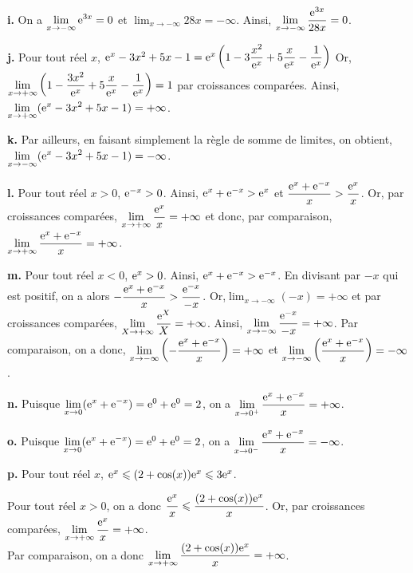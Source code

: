 \documentclass[11pt,fleqn, openany]{book} %
\begin{document}
\begin{solution}
\textbf{i.} On a $\displaystyle\lim _{x\to - \infty}\mathrm{e}^{3x}=0$ et $\displaystyle\lim _{x\to - \infty} 28x=-\infty$. Ainsi, $\displaystyle\lim _{x\to - \infty} \dfrac{\mathrm{e}^{3x}}{28x}=0$. 

\textbf{j.} Pour tout réel $x$, $\mathrm{e}^x - 3x^2+5x-1=\mathrm{e}^x\left(1-3\dfrac{x^2}{\mathrm{e}^x}+5\dfrac{x}{\mathrm{e}^x}-\dfrac{1}{\mathrm{e}^x}\right)$ Or, $\displaystyle\lim _{x\to + \infty} \left( 1-\dfrac{3x^2}{\mathrm{e}^x}+5\dfrac{x}{\mathrm{e}^x}-\dfrac{1}{\mathrm{e}^x}\right)=1$ par croissances comparées. Ainsi, $\displaystyle\lim _{x\to + \infty}(\mathrm{e}^x - 3x^2+5x-1)=+\infty$. 

\textbf{k.} Par ailleurs, en faisant simplement la règle de somme de limites, on obtient, $\displaystyle\lim _{x\to - \infty}(\mathrm{e}^x - 3x^2+5x-1)=-\infty$.
 
\textbf{l.} Pour tout réel $x>0$, $\mathrm{e}^{-x}>0$. Ainsi, $\mathrm{e}^x+\mathrm{e}^{-x}>\mathrm{e}^x$ et $\dfrac{\mathrm{e}^x+\mathrm{e}^{-x}}{x}>\dfrac{\mathrm{e}^x}{x}$. Or, par croissances comparées, $\displaystyle \lim_{x \to +\infty} \dfrac{\mathrm{e}^x}{x}=+\infty$ et donc, par comparaison, $\displaystyle \lim_{x \to +\infty} \dfrac{\mathrm{e}^x+\mathrm{e}^{-x}}{x}=+\infty$.

\textbf{m.} Pour tout réel $x<0$, $\mathrm{e}^x>0$. Ainsi, $\mathrm{e}^x+\mathrm{e}^{-x}>\mathrm{e}^{-x}$. En divisant par $-x$ qui est positif, on a alors $-\dfrac{\mathrm{e}^x+\mathrm{e}^{-x}}{x}> \dfrac{\mathrm{e}^{-x}}{-x}$. Or,$\displaystyle \lim_{x \to -\infty }(-x)=+\infty$ et par croissances comparées, $\displaystyle \lim_{X \to +\infty} \dfrac{\mathrm{e}^X}{X}=+\infty$. Ainsi, $\displaystyle \lim_{x \to -\infty} \dfrac{\mathrm{e}^{-x}}{-x}=+\infty$. Par comparaison, on a donc, $\displaystyle \lim_{x \to -\infty} \left(-\dfrac{\mathrm{e}^x+\mathrm{e}^{-x}}{x}\right)=+\infty$ et $\displaystyle \lim_{x \to -\infty} \left(\dfrac{\mathrm{e}^x+\mathrm{e}^{-x}}{x}\right)=-\infty$.

\textbf{n.} Puisque $\displaystyle \lim_{x \to 0} (\mathrm{e}^x+\mathrm{e}^{-x})=\mathrm{e}^0+\mathrm{e}^0=2$, on a $\displaystyle \lim_{x \to 0^+} \dfrac{\mathrm{e}^x+\mathrm{e}^{-x}}{x} = +\infty$.

\textbf{o.} Puisque $\displaystyle \lim_{x \to 0} (\mathrm{e}^x+\mathrm{e}^{-x})=\mathrm{e}^0+\mathrm{e}^0=2$, on a $\displaystyle \lim_{x \to 0^-} \dfrac{\mathrm{e}^x+\mathrm{e}^{-x}}{x} = -\infty$.

\textbf{p.} Pour tout réel $x$, $\mathrm{e}^x \leqslant (2+\cos(x))\mathrm{e}^x \leqslant 3\mathrm{e}^x$.
 
 Pour tout réel $x>0$, on a donc $\dfrac{\mathrm{e}^x}{x} \leqslant \dfrac{(2+\cos(x))\mathrm{e}^x}{x}$. Or, par croissances comparées, $\displaystyle \lim_{x \to +\infty} \dfrac{\mathrm{e}^x}{x}=+\infty$. \\ Par comparaison, on a donc $\displaystyle \lim_{x \to +\infty}\dfrac{(2+\cos(x))\mathrm{e}^x}{x}=+\infty$.
 

\end{solution}
\end{document}
